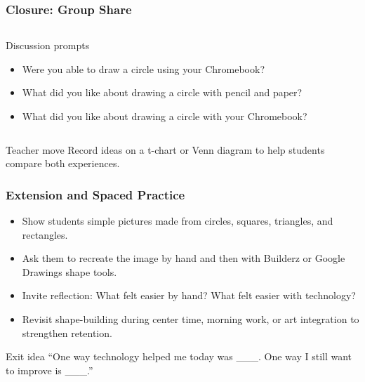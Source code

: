 \documentclass[aspectratio=169]{beamer}
\begin{document}
\begin{frame}[plain]
\frametitle{Closure: Group Share}
\begin{columns}[T,totalwidth=\textwidth]
\begin{block}{Discussion prompts}
\begin{itemize}
\large
\item Were you able to draw a circle using your Chromebook?
\item What did you like about drawing a circle with pencil and paper?
\item What did you like about drawing a circle with your Chromebook?
\end{itemize}
\end{block}
\end{columns}
\vspace{0.18cm}
\begin{block}{Teacher move}
\large Record ideas on a t-chart or Venn diagram to help students compare both experiences.
\end{block}
\end{frame}

\begin{frame}[plain]
\frametitle{Extension and Spaced Practice}
\begin{itemize}
\large
\item Show students simple pictures made from circles, squares, triangles, and rectangles.
\item Ask them to recreate the image by hand and then with Builderz or Google Drawings shape tools.
\item Invite reflection: What felt easier by hand? What felt easier with technology?
\item Revisit shape-building during center time, morning work, or art integration to strengthen retention.
\end{itemize}
\vspace{0.22cm}
\begin{block}{Exit idea}
\large ``One way technology helped me today was \_\_\_. One way I still want to improve is \_\_\_.'' 
\end{block}
\end{frame}
\end{document}
